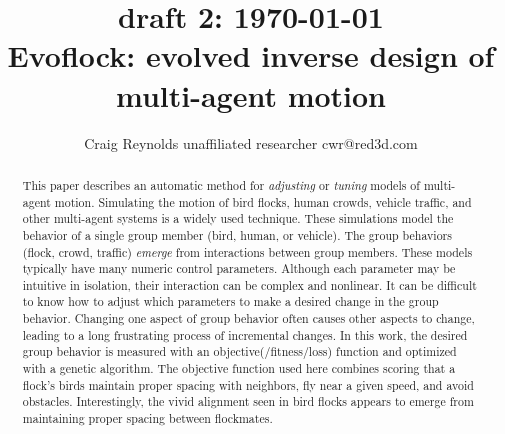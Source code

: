 \documentclass[letterpaper]{article}
\begin{document}
\title{{\tiny draft 2: \today}\\Evoflock: evolved inverse design of multi-agent motion}

\author{Craig Reynolds\authorcr
    unaffiliated researcher\authorcr 
    cwr@red3d.com}


\captionsetup{hypcap=false}


\date{}

\maketitle



\begin{abstract}
    This paper describes an automatic method for \textit{adjusting} or \textit{tuning} models of multi-agent motion. Simulating the motion of bird flocks, human crowds, vehicle traffic, and other multi-agent systems is a widely used technique. These simulations model the behavior of a single group member (bird, human, or vehicle). The group behaviors (flock, crowd, traffic) \textit{emerge} from interactions between group members. These models typically have many numeric control parameters. Although each parameter may be intuitive in isolation, their interaction can be complex and nonlinear. It can be difficult to know how to adjust which parameters to make a desired change in the group behavior. Changing one aspect of group behavior often causes other aspects to change, leading to a long frustrating process of incremental changes. In this work, the desired group behavior is measured with an objective(/fitness/loss) function and optimized with a genetic algorithm. The objective function used here combines scoring that a flock's birds maintain proper spacing with neighbors, fly near a given speed, and avoid obstacles. Interestingly, the vivid alignment seen in bird flocks appears to emerge from maintaining proper spacing between flockmates.
\end{abstract}
\end{document}
